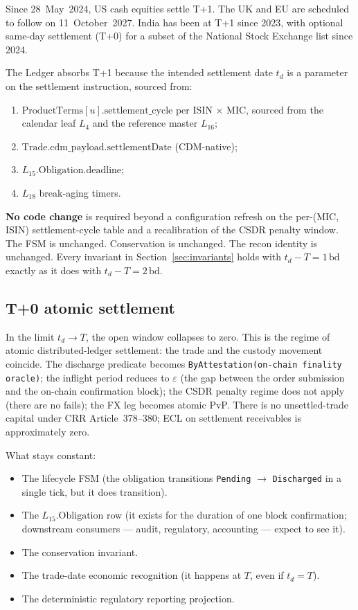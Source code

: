 \documentclass[11pt,a4paper]{article}
\begin{document}
Since 28~May~2024, US cash equities settle T+1. The UK and EU are scheduled to follow on 11~October~2027. India has been at T+1 since 2023, with optional same-day settlement (T+0) for a subset of the National Stock Exchange list since 2024.

The Ledger absorbs T+1 because the intended settlement date $t_d$ is a parameter on the settlement instruction, sourced from:
\begin{enumerate}[nosep]
\item $\mathrm{ProductTerms}[u].\mathrm{settlement\_cycle}$ per ISIN $\times$ MIC, sourced from the calendar leaf $L_4$ and the reference master $L_{16}$;
\item $\mathrm{Trade}.\mathrm{cdm\_payload}.\mathrm{settlementDate}$ (CDM-native);
\item $L_{15}.\mathrm{Obligation}.\mathrm{deadline}$;
\item $L_{18}$ break-aging timers.
\end{enumerate}

\textbf{No code change} is required beyond a configuration refresh on the per-(MIC, ISIN) settlement-cycle table and a recalibration of the CSDR penalty window. The FSM is unchanged. Conservation is unchanged. The recon identity is unchanged. Every invariant in Section~\ref{sec:invariants} holds with $t_d - T = 1\,\mathrm{bd}$ exactly as it does with $t_d - T = 2\,\mathrm{bd}$.

\subsection{T+0 atomic settlement}
\label{sec:variant-tplus0}

In the limit $t_d \to T$, the open window collapses to zero. This is the regime of atomic distributed-ledger settlement: the trade and the custody movement coincide. The discharge predicate becomes \texttt{ByAttestation(on-chain finality oracle)}; the inflight period reduces to $\varepsilon$ (the gap between the order submission and the on-chain confirmation block); the CSDR penalty regime does not apply (there are no fails); the FX leg becomes atomic PvP. There is no unsettled-trade capital under CRR Article~378--380; ECL on settlement receivables is approximately zero.

What stays constant:
\begin{itemize}[nosep]
\item The lifecycle FSM (the obligation transitions \texttt{Pending} $\to$ \texttt{Discharged} in a single tick, but it does transition).
\item The $L_{15}.\mathrm{Obligation}$ row (it exists for the duration of one block confirmation; downstream consumers --- audit, regulatory, accounting --- expect to see it).
\item The conservation invariant.
\item The trade-date economic recognition (it happens at $T$, even if $t_d = T$).
\item The deterministic regulatory reporting projection.
\end{itemize}
\end{document}
